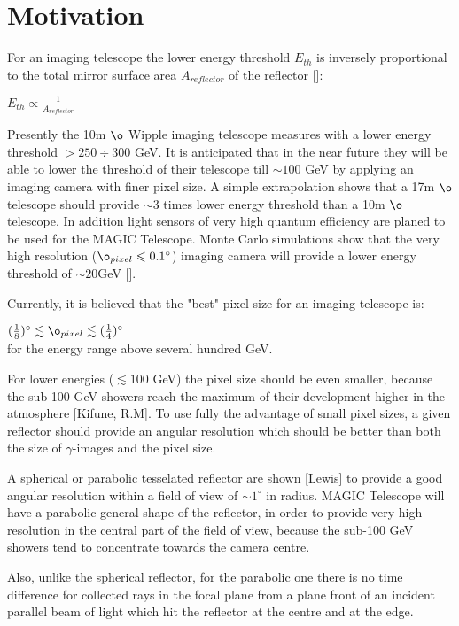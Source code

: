 \section{Motivation}

{\footnotesize 
For an imaging telescope the lower energy threshold $E_{th}$ is inversely proportional to the total mirror surface area $A_{reflector}$ of the reflector []:

\vspace{0.2cm}

\centerline {$E_{th} \varpropto \frac{1}{A_{reflector}}$}

\vspace{0.2cm}

Presently the 10m $\o $ Wipple imaging telescope measures with a lower energy threshold $ > 250 \div 300 $ GeV. It is anticipated that in the near future they will be able to lower the threshold of their telescope till $ \sim 100 $ GeV by applying an imaging camera with finer pixel size. A simple extrapolation shows that a 17m $\o $ telescope should provide $ \sim 3$ times lower energy threshold than a 10m $\o$ telescope. In addition light sensors of very high quantum efficiency are planed to be used for the MAGIC Telescope. Monte Carlo simulations show that the very high resolution ($\o_{pixel}   \leqslant 0.1^{\circ} $) imaging camera will provide a lower energy threshold of $\sim  20 $GeV [].

\vspace{1cm}

 Currently, it is believed that the "best" pixel size for an imaging telescope is:

 $(\frac{1}{8})^{\circ} \lesssim \o_{pixel} \lesssim (\frac{1}{4})^{\circ}$ \\ 
 for the energy range above several hundred GeV.

 For lower energies ($ \lesssim 100 $ GeV) the pixel size should be even smaller, because the sub-100 GeV showers reach the maximum of their development higher in the atmosphere [Kifune, R.M]. To use fully the advantage of small pixel sizes, a given reflector should provide an angular resolution which should be better than both the size of $\gamma$-images and the pixel size.

A spherical or parabolic tesselated reflector are shown  [Lewis] to provide a good angular resolution within a field of view of $ \sim 1^{\circ} $ in radius. MAGIC Telescope will have a parabolic general shape of the reflector, in order to provide very high resolution in the central part of the field of view, because the sub-100 GeV showers tend to  concentrate towards the camera centre.

Also, unlike the spherical reflector, for the parabolic one there is no time difference for collected rays in the focal plane from a plane front of an incident parallel beam of light which hit the reflector at the centre and at the edge. 

}
